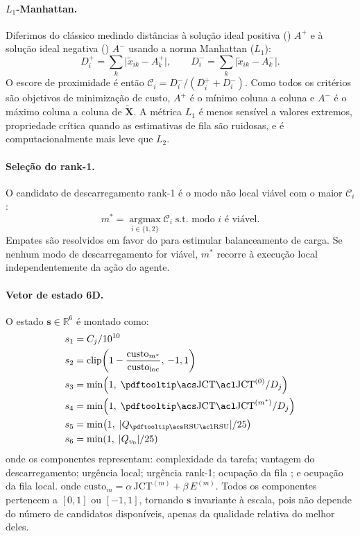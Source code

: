 \paragraph{ $L_1$-Manhattan.}
Diferimos do  clássico medindo distâncias à solução ideal positiva ()
$A^+$ e à solução ideal negativa () $A^-$ usando a norma Manhattan
($L_1$):
\begin{equation}
  D_i^+ = \textstyle\sum_{k} \lvert \widetilde{x}_{ik} - A_k^+ \rvert,
  \qquad
  D_i^- = \textstyle\sum_{k} \lvert \widetilde{x}_{ik} - A_k^- \rvert.
  \label{eq:manhattan}
\end{equation}
O escore de proximidade é então $\mathcal{C}_i = D_i^- / (D_i^+ + D_i^-)$.
Como todos os critérios são objetivos de minimização de custo, $A^+$ é o
mínimo coluna a coluna e $A^-$ é o máximo coluna a coluna de
$\widetilde{\mathbf{X}}$.
A métrica $L_1$ é menos sensível a valores extremos, propriedade crítica quando
as estimativas de fila são ruidosas, e é computacionalmente mais leve que $L_2$.

\paragraph{Seleção do rank-1.}
O candidato de descarregamento rank-1 é o modo não local viável com o
maior $\mathcal{C}_i$:
\begin{equation}
  m^* = \operatorname*{argmax}_{i \in \{1,2\}} \mathcal{C}_i
        \;\text{s.t.\ modo } i \text{ é viável}.
  \label{eq:rank1}
\end{equation}
Empates são resolvidos em favor do  para estimular balanceamento de carga.
Se nenhum modo de descarregamento for viável, $m^*$ recorre à execução local
independentemente da ação do agente.

\paragraph{Vetor de estado 6D.}
O estado $\mathbf{s} \in \mathbb{R}^6$ é montado como:
\begin{align}
  s_1 &= C_j / 10^{10} \notag \\
  s_2 &= \mathrm{clip}\!\left(1 - \frac{\mathrm{custo}_{m^*}}{\mathrm{custo}_{\mathrm{loc}}},\,-1,1\right) \notag \\
  s_3 &= \min\!\left(1,\; \mathrm{\acrotip{JCT}}^{(0)} / D_j\right) \notag \\
  s_4 &= \min\!\left(1,\; \mathrm{\acrotip{JCT}}^{(m^*)} / D_j\right) \notag \\
  s_5 &= \min\!\left(1,\; |Q_{\mathrm{\acrotip{RSU}}}| / 25\right) \notag \\
  s_6 &= \min\!\left(1,\; |Q_{v_0}| / 25\right)
  \label{eq:state}
\end{align}
{\scriptsize onde os componentes representam: complexidade da tarefa; vantagem do descarregamento; urgência local; urgência rank-1; ocupação da fila ; e ocupação da fila local.}
onde $\mathrm{custo}_m = \alpha\,\mathrm{JCT}^{(m)} + \beta\,E^{(m)}$.
Todos os componentes pertencem a $[0,1]$ ou $[-1,1]$, tornando $\mathbf{s}$
invariante à escala, pois não depende do número de candidatos disponíveis,
apenas da qualidade relativa do melhor deles.

